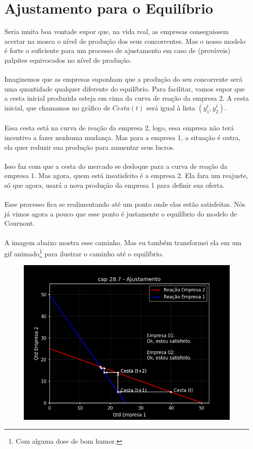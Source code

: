 \documentclass[a4paper,11pt,oneside]{book}
\theoremstyle{definition}
\theoremstyle{break}
\begin{document}
\section{Ajustamento para o Equilíbrio}

Seria muita boa vontade supor que, na vida real, as empresas conseguissem acertar na mosca o nível de produção dos seus concorrentes. Mas o nosso modelo é forte o suficiente para um processo de ajustamento em caso de (prováveis) palpites equivocados no nível de produção.
\\~\\
Imaginemos que as empresas suponham que a produção do seu concorrente será uma quantidade qualquer diferente do equilíbrio. Para facilitar, vamos supor que a cesta inicial produzida esteja em cima da curva de reação da empresa 2. A cesta inicial, que chamamos no gráfico de $Cesta(t)$ será igual à lista $(y_1^t,y_2^t)$.
\\~\\
Essa cesta está na curva de reação da empresa 2, logo, essa empresa não terá incentivo a fazer nenhuma mudança. Mas para a empresa 1, a situação é outra, ela quer reduzir sua produção para aumentar seus lucros.
\\~\\
Isso faz com que a cesta do mercado se desloque para a curva de reação da empresa 1. Mas agora, quem está insatisfeito é a empresa 2. Ela fara um reajuste, só que agora, usará a nova produção da empresa 1 para definir sua oferta.
\\~\\
Esse processo fica se realimentando até um ponto onde elas estão satisfeitas. Nós já vimos agora a pouco que esse ponto é justamente o equilíbrio do modelo de Cournout.
\\~\\
A imagem abaixo mostra esse caminho. Mas eu também transformei ela em um gif animado\footnote{Com alguma dose de bom humor.} para ilustrar o caminho até o equilíbrio.

\begin{figure}[H]
	\centering
	\includegraphics[scale=0.75]{cap28_7-ajustamento.png}
\end{figure}
\end{document}

